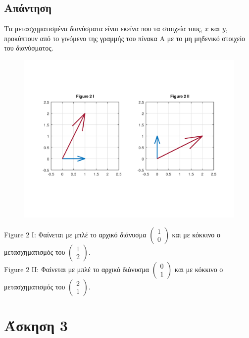\documentclass[a4paper,12pt]{article}
\begin{document}
\subsection{Απάντηση}
Τα μετασχηματισμένα διανύσματα είναι εκείνα που τα στοιχεία τους, $x$ και $y$,
προκύπτουν από το γινόμενο της γραμμής του πίνακα Α με το μη μηδενικό στοιχείο
του διανύσματος.
\begin{center}
	\begin{figure}[H]
		\centering
		\includegraphics[scale=0.8]{2i_ii.png}
	\end{figure}
	Figure 2 I: Φαίνεται με μπλέ το αρχικό διάνυσμα $
		\begin{pmatrix}
			1 \\
			0
		\end{pmatrix}
	$ και με κόκκινο ο μετασχηματισμός του $
		\begin{pmatrix}
			1 \\
			2
		\end{pmatrix}
	$.\\
	Figure 2 II: Φαίνεται με μπλέ το αρχικό διάνυσμα $
		\begin{pmatrix}
			0 \\
			1
		\end{pmatrix}
	$ και με κόκκινο ο μετασχηματισμός του $
		\begin{pmatrix}
			2 \\
			1
		\end{pmatrix}
	$.
\end{center}
\newpage\section{Άσκηση 3}
\end{document}
